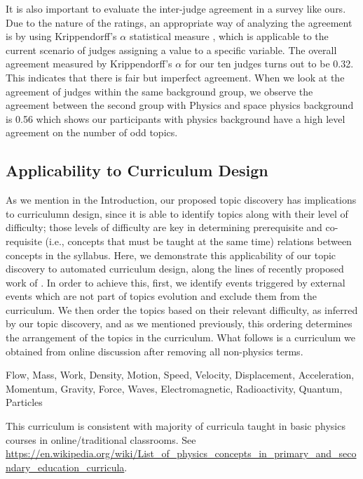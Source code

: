 It is also important to evaluate the inter-judge  agreement in a survey like ours. Due to the nature of
the ratings, an appropriate way of analyzing the agreement is by using Krippendorff’s $\alpha$
statistical measure \cite{krippendorff1970estimating}, which is applicable to the current scenario of
judges assigning a value to a specific variable. The overall agreement measured by Krippendorff’s
$\alpha$ for our ten judges turns out to be 0.32. This indicates that there is fair but imperfect
agreement. When we look at the agreement of judges within the same background group, we observe the
agreement between the second group with Physics and space physics background is 0.56 which shows our
participants with physics background have a high level agreement on the number of odd topics.

\subsection{Applicability to Curriculum Design}
As we mention in the Introduction, our proposed topic discovery has implications to curriculumn design,
since it is able to identify topics along with their level of difficulty; those levels of difficulty
are key in determining prerequisite and co-requisite (i.e., concepts that must be taught at the same
time) relations between concepts in the syllabus.
Here, we demonstrate this applicability of our topic discovery to automated curriculum
design, along the lines of recently proposed work of \cite{agrawal2016toward, agrawal2015datadriven}. In order to achieve
this, first, we identify events triggered by external events which are not part of topics evolution
and exclude them from the curriculum. We then order the topics based on their relevant difficulty,
as inferred by our topic discovery, and as we mentioned previously, this ordering determines the
arrangement of the topics in the curriculum. What follows is a curriculum we obtained from online
discussion after removing all non-physics terms. 
\begin{mdframed}[backgroundcolor=blue!4] 
\centering
\footnotesize
Flow, Mass, Work, Density, Motion, Speed, Velocity, Displacement, Acceleration, Momentum, Gravity,
    Force, Waves, Electromagnetic, Radioactivity,  Quantum, Particles
\end{mdframed} 
This curriculum is consistent with majority of curricula taught in basic physics courses in online/traditional classrooms. See { \footnotesize \url{https://en.wikipedia.org/wiki/List_of_physics_concepts_in_primary_and_secondary_education_curricula}}. 
